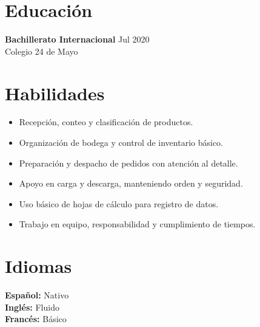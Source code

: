 \documentclass[11pt,a4paper]{article}
\newenvironment{uniformindent}{%
  \begin{list}{}{%
    \setlength{\leftmargin}{2em}
    \setlength{\rightmargin}{0pt}
    \setlength{\topsep}{0pt}
    \setlength{\partopsep}{0pt}
    \setlength{\parsep}{0pt}
    \setlength{\itemsep}{0pt}
  }
  \item[]
}{%
  \end{list}
}
\begin{document}
\begin{uniformindent}
\section*{Educaci\'on}

\begin{samepage}
\textbf{Bachillerato Internacional} \hfill Jul 2020\\
Colegio 24 de Mayo\\
\end{samepage}

\section*{Habilidades}

\begin{itemize}
    \item Recepci\'on, conteo y clasificaci\'on de productos.
    \item Organizaci\'on de bodega y control de inventario b\'asico.
    \item Preparaci\'on y despacho de pedidos con atenci\'on al detalle.
    \item Apoyo en carga y descarga, manteniendo orden y seguridad.
    \item Uso b\'asico de hojas de c\'alculo para registro de datos.
    \item Trabajo en equipo, responsabilidad y cumplimiento de tiempos.
\end{itemize}

\section*{Idiomas}

\textbf{Espa\~nol:} Nativo\\
\textbf{Ingl\'es:} Fluido\\
\textbf{Franc\'es:} B\'asico

\end{uniformindent}
\end{document}
